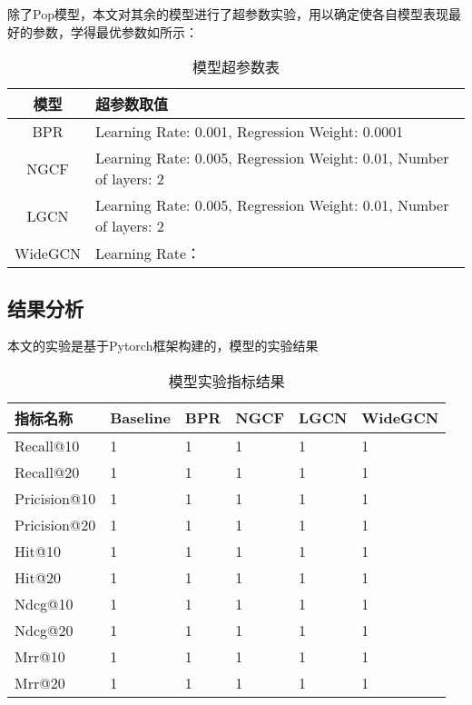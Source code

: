 \documentclass[lang=cn,11pt,a4paper,cite=authoryear]{elegantpaper}
\begin{document}
除了Pop模型，本文对其余的模型进行了超参数实验，用以确定使各自模型表现最好的参数，学得最优参数如所示：
\begin{center}
  \begin{longtable}{c|l}
    \caption{模型超参数表}
    \label{超参数表}\\
      \hline
      \textbf{模型} & \textbf{超参数取值} \\
      \hline
      BPR & Learning Rate: 0.001, Regression Weight: 0.0001 \\
      NGCF & Learning Rate: 0.005, Regression Weight: 0.01, Number of layers: 2 \\
      LGCN & Learning Rate: 0.005, Regression Weight: 0.01, Number of layers: 2 \\
      WideGCN & Learning Rate： \\
      \hline
  \end{longtable}
  \end{center}



\subsection{结果分析}
本文的实验是基于Pytorch框架构建的，模型的实验结果

  \begin{table}[!htb]
    \centering
    \caption{模型实验指标结果}
      \huge
      \begin{tabular}{C{2cm}|C{1.5cm}|C{1.5cm}|C{1.5cm}|C{1.5cm}|C{1.5cm}}
      \hline
      \textbf{指标名称} & \textbf{Baseline} & \textbf{BPR} & \textbf{NGCF} & \textbf{LGCN} & \textbf{WideGCN} \\
      \hline
      Recall@10 & 1 & 1 & 1 & 1& 1\\
      Recall@20 & 1 & 1 & 1 & 1& 1\\
      Pricision@10 & 1 & 1 & 1 & 1& 1\\
      Pricision@20 & 1 & 1 & 1 & 1& 1\\
      Hit@10 & 1 & 1 & 1 & 1& 1\\
      Hit@20 & 1 & 1 & 1 & 1& 1\\
      Ndcg@10 & 1 & 1 & 1 & 1& 1\\
      Ndcg@20 & 1 & 1 & 1 & 1& 1\\
      Mrr@10 & 1 & 1 & 1 & 1& 1\\
      Mrr@20 & 1 & 1 & 1 & 1& 1\\
      \hline
      \end{tabular}
    \label{模型实验指标结果}
  \end{table}
\end{document}
